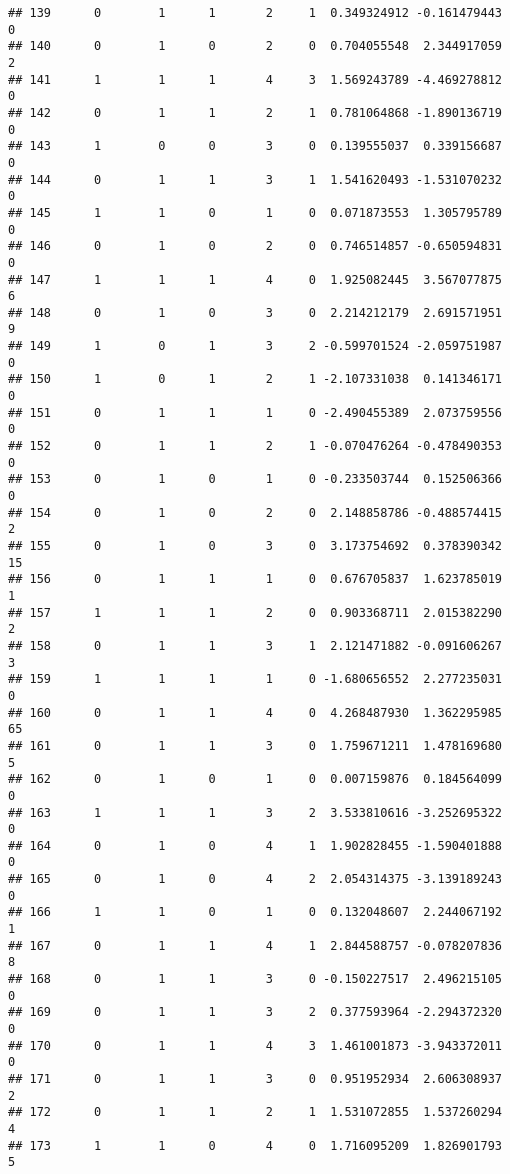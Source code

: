 \documentclass[]{article}
\begin{document}
\begin{verbatim}
## 139      0        1      1       2     1  0.349324912 -0.161479443     0
## 140      0        1      0       2     0  0.704055548  2.344917059     2
## 141      1        1      1       4     3  1.569243789 -4.469278812     0
## 142      0        1      1       2     1  0.781064868 -1.890136719     0
## 143      1        0      0       3     0  0.139555037  0.339156687     0
## 144      0        1      1       3     1  1.541620493 -1.531070232     0
## 145      1        1      0       1     0  0.071873553  1.305795789     0
## 146      0        1      0       2     0  0.746514857 -0.650594831     0
## 147      1        1      1       4     0  1.925082445  3.567077875     6
## 148      0        1      0       3     0  2.214212179  2.691571951     9
## 149      1        0      1       3     2 -0.599701524 -2.059751987     0
## 150      1        0      1       2     1 -2.107331038  0.141346171     0
## 151      0        1      1       1     0 -2.490455389  2.073759556     0
## 152      0        1      1       2     1 -0.070476264 -0.478490353     0
## 153      0        1      0       1     0 -0.233503744  0.152506366     0
## 154      0        1      0       2     0  2.148858786 -0.488574415     2
## 155      0        1      0       3     0  3.173754692  0.378390342    15
## 156      0        1      1       1     0  0.676705837  1.623785019     1
## 157      1        1      1       2     0  0.903368711  2.015382290     2
## 158      0        1      1       3     1  2.121471882 -0.091606267     3
## 159      1        1      1       1     0 -1.680656552  2.277235031     0
## 160      0        1      1       4     0  4.268487930  1.362295985    65
## 161      0        1      1       3     0  1.759671211  1.478169680     5
## 162      0        1      0       1     0  0.007159876  0.184564099     0
## 163      1        1      1       3     2  3.533810616 -3.252695322     0
## 164      0        1      0       4     1  1.902828455 -1.590401888     0
## 165      0        1      0       4     2  2.054314375 -3.139189243     0
## 166      1        1      0       1     0  0.132048607  2.244067192     1
## 167      0        1      1       4     1  2.844588757 -0.078207836     8
## 168      0        1      1       3     0 -0.150227517  2.496215105     0
## 169      0        1      1       3     2  0.377593964 -2.294372320     0
## 170      0        1      1       4     3  1.461001873 -3.943372011     0
## 171      0        1      1       3     0  0.951952934  2.606308937     2
## 172      0        1      1       2     1  1.531072855  1.537260294     4
## 173      1        1      0       4     0  1.716095209  1.826901793     5

\end{verbatim}
\end{document}
